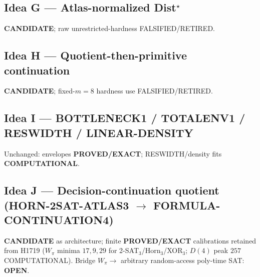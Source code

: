 \documentclass[11pt]{article}
\begin{document}
\subsection*{Idea G --- Atlas-normalized Dist$^\star$}
\textbf{CANDIDATE}; raw unrestricted-hardness FALSIFIED/RETIRED.

\subsection*{Idea H --- Quotient-then-primitive continuation}
\textbf{CANDIDATE}; fixed-$m=8$ hardness use FALSIFIED/RETIRED.

\subsection*{Idea I --- BOTTLENECK1 / TOTALENV1 / RESWIDTH / LINEAR-DENSITY}
Unchanged: envelopes \textbf{PROVED/EXACT}; RESWIDTH/density fits \textbf{COMPUTATIONAL}.

\subsection*{Idea J --- Decision-continuation quotient (HORN-2SAT-ATLAS3 $\to$ FORMULA-CONTINUATION4)}
\textbf{CANDIDATE} as architecture; finite \textbf{PROVED/EXACT} calibrations retained from H1719
($W_\pi$ minima $17,9,29$ for 2-SAT$_3$/Horn$_3$/XOR$_3$; $D(4)$ peak $257$ COMPUTATIONAL).
Bridge $W_\pi\to$ arbitrary random-access poly-time SAT: \textbf{OPEN}.
\end{document}
